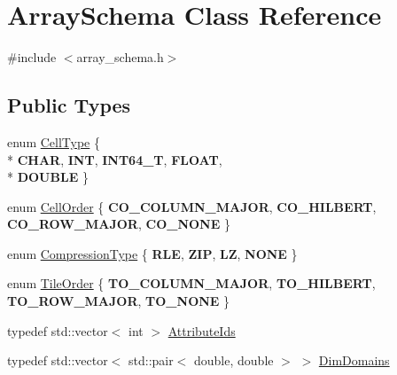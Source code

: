 \hypertarget{classArraySchema}{}\section{Array\+Schema Class Reference}
\label{classArraySchema}


{\ttfamily \#include $<$array\+\_\+schema.\+h$>$}

\subsection*{Public Types}
\begin{DoxyCompactItemize}
\item 
enum \hyperlink{classArraySchema_af0490cb0a1e903b6fc768daa91cb5eed}{Cell\+Type} \{ \\*
{\bfseries C\+H\+A\+R}, 
{\bfseries I\+N\+T}, 
{\bfseries I\+N\+T64\+\_\+\+T}, 
{\bfseries F\+L\+O\+A\+T}, 
\\*
{\bfseries D\+O\+U\+B\+L\+E}
 \}
\item 
enum \hyperlink{classArraySchema_a847601130253f905337b5e284e1b78f2}{Cell\+Order} \{ {\bfseries C\+O\+\_\+\+C\+O\+L\+U\+M\+N\+\_\+\+M\+A\+J\+O\+R}, 
{\bfseries C\+O\+\_\+\+H\+I\+L\+B\+E\+R\+T}, 
{\bfseries C\+O\+\_\+\+R\+O\+W\+\_\+\+M\+A\+J\+O\+R}, 
{\bfseries C\+O\+\_\+\+N\+O\+N\+E}
 \}
\item 
enum \hyperlink{classArraySchema_a167615fb84dd6124ab2dac0dbbf35d46}{Compression\+Type} \{ {\bfseries R\+L\+E}, 
{\bfseries Z\+I\+P}, 
{\bfseries L\+Z}, 
{\bfseries N\+O\+N\+E}
 \}
\item 
enum \hyperlink{classArraySchema_ae9240847f83a545b7de651f032ffde63}{Tile\+Order} \{ {\bfseries T\+O\+\_\+\+C\+O\+L\+U\+M\+N\+\_\+\+M\+A\+J\+O\+R}, 
{\bfseries T\+O\+\_\+\+H\+I\+L\+B\+E\+R\+T}, 
{\bfseries T\+O\+\_\+\+R\+O\+W\+\_\+\+M\+A\+J\+O\+R}, 
{\bfseries T\+O\+\_\+\+N\+O\+N\+E}
 \}
\item 
typedef std\+::vector$<$ int $>$ \hyperlink{classArraySchema_a55137cd3ae03a3978fd17f36025ca2a8}{Attribute\+Ids}
\item 
typedef std\+::vector$<$ std\+::pair$<$ double, double $>$ $>$ \hyperlink{classArraySchema_aa0dcbbfd193648a9500d54e104115de8}{Dim\+Domains}
\end{DoxyCompactItemize}
